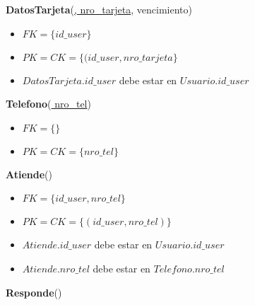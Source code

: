 
\vspace*{0.1cm}
\noindent
\textbf{DatosTarjeta}(\underline{, 
	nro\_tarjeta}, 
    vencimiento)

\begin{itemize}[noitemsep]
	\item $FK = \{id\_user\}$
	\item $PK = CK = \{(id\_user, nro\_tarjeta\}$
	\item $DatosTarjeta.id\_user$ debe estar en $Usuario.id\_user$
\end{itemize}


\noindent
\textbf{Telefono}(\underline{
	nro\_tel})

\begin{itemize}[noitemsep]
    \item $FK = \{\}$
    \item $PK = CK = \{nro\_tel\}$    
\end{itemize}


\vspace*{0.1cm}
\noindent
\textbf{Atiende}(\underline{})

\begin{itemize}[noitemsep]
	\item $FK = \{id\_user, nro\_tel\}$
	\item $PK = CK = \{(id\_user, nro\_tel)\}$
	\item $Atiende.id\_user$ debe estar en $Usuario.id\_user$
	\item $Atiende.nro\_tel$ debe estar en $Telefono.nro\_tel$
\end{itemize}


\newpage
\vspace*{0.1cm}
\noindent
\textbf{Responde}(\underline{})

